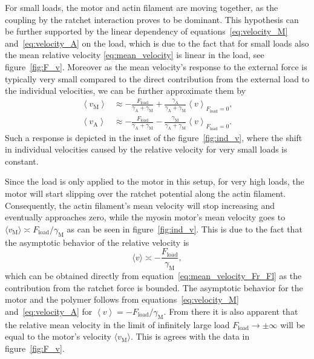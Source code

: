 \documentclass[aps,pre,twocolumn,showpacs,showkeys,superscriptaddress,floatfix]{revtex4-1}
\begin{document}
For small loads, the motor and actin filament are moving together, as the coupling by the ratchet interaction proves to be dominant. 
This hypothesis can be further supported by the linear dependency of equations~\eqref{eq:velocity_M} and~\eqref{eq:velocity_A} on the load, 
which is due to the fact that for small loads also the mean relative velocity \eqref{eq:mean_velocity} is linear in the load, see figure~\ref{fig:F_v}. 
Moreover as the mean velocity's response to the external force is typically very small compared to the direct contribution from the external load to the individual velocities,
we can be further approximate them by  
\begin{align*}
\left\langle v_\text{M} \right\rangle 
&\approx - \frac{ F_\text{load} }{ \gamma_\text{A} + \gamma_\text{M} } + \frac{ \gamma_\text{A} }{ \gamma_\text{A} + \gamma_\text{M} } \left\langle v \right\rangle_{ F_\text{load} = 0 },
\\
\left\langle v_\text{A} \right\rangle 
&\approx - \frac{ F_\text{load} }{ \gamma_\text{A} + \gamma_\text{M} } - \frac{ \gamma_\text{M} }{ \gamma_\text{A} + \gamma_\text{M} } \left\langle v \right\rangle_{ F_\text{load} = 0 } .
\end{align*}
Such a response is depicted in the inset of the figure~\ref{fig:ind_v}, where the shift in individual velocities caused by the relative velocity for very small loads is constant.

Since the load is only applied to the motor in this setup, for very high loads, the motor will start slipping over the ratchet potential along the actin filament. 
Consequently, the actin filament's mean velocity will stop increasing and eventually approaches zero, 
while the myosin motor's mean velocity goes to $\langle v_\text{M} \rangle \asymp F_\text{load}/\gamma_\text{M} $
as can be seen in figure~\ref{fig:ind_v}. 
This is due to the fact that the asymptotic behavior of the relative velocity  is
\[
\langle v \rangle \asymp - \frac{ F_\text{load} }{\gamma_\text{M} },
\]
which can be obtained directly from equation~\eqref{eq:mean_velocity_Fr_Fl} as the contribution from the ratchet force is bounded.
The asymptotic behavior for the motor and the polymer follows from equations~\eqref{eq:velocity_M} and~\eqref{eq:velocity_A} for $ \left\langle v \right\rangle = - F_\text{load} / \gamma_\text{M} $. 
From there it is also apparent that the relative mean velocity in the limit of infinitely large load $F_\text{load} \to \pm \infty$ will be equal to the motor's velocity $\langle v_\text{M} \rangle$.
This is agrees with the data in figure~\ref{fig:F_v}.
\end{document}
